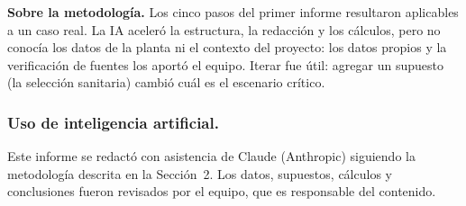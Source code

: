 \documentclass[runningheads]{llncs}
\begin{document}
\textbf{Sobre la metodología.} Los cinco pasos del primer informe resultaron aplicables a un caso real. La IA aceleró la estructura, la redacción y los cálculos, pero no conocía los datos de la planta ni el contexto del proyecto: los datos propios y la verificación de fuentes los aportó el equipo. Iterar fue útil: agregar un supuesto (la selección sanitaria) cambió cuál es el escenario crítico.

\begin{credits}
\subsubsection{Uso de inteligencia artificial.} Este informe se redactó con asistencia de Claude (Anthropic) siguiendo la metodología descrita en la Sección~2. Los datos, supuestos, cálculos y conclusiones fueron revisados por el equipo, que es responsable del contenido.
\end{credits}
\end{document}
